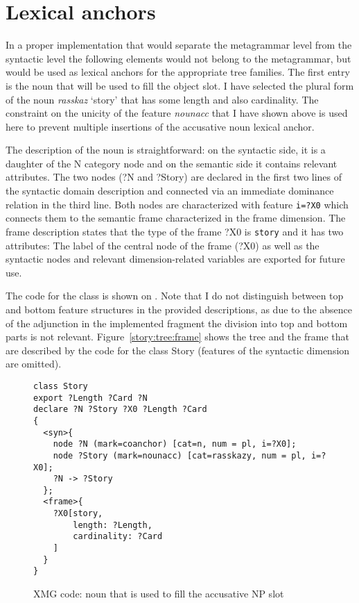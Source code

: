 \section{Lexical anchors}
In a proper implementation that would separate the metagrammar level from the syntactic level the following elements would not belong to the metagrammar, but would be used as lexical anchors for the appropriate tree families. The first entry is the noun that will be used to fill the object slot. I have selected the plural form of the noun \textit{rasskaz} `story' that has some length and also cardinality. The constraint on the unicity of the feature \textit{nounacc} that I have shown above is used here to prevent multiple insertions of the accusative noun lexical anchor.

The description of the noun is straightforward: on the syntactic side, it is a daughter of the N category node and on the semantic side it contains relevant attributes. The two nodes (?N and ?Story) are declared in the first two lines of the syntactic domain description and connected via an immediate dominance relation in the third line. Both nodes are characterized with feature \texttt{i=?X0} which connects them to the semantic frame characterized in the frame dimension. The frame description states that the type of the frame ?X0 is \texttt{story} and it has two attributes: The label of the central node of the frame (?X0) as well as the syntactic nodes and relevant dimension-related variables are exported for future use. 

The code for the class is shown on . Note that I do not distinguish between top and bottom feature structures in the provided descriptions, as due to the absence of the adjunction in the implemented fragment the division into top and bottom parts is not relevant. Figure~\ref{story:tree:frame} shows the tree and the frame that are described by the code for the class Story (features of the syntactic dimension are omitted).

\begin{figure}
\begin{verbatim}
class Story
export ?Length ?Card ?N
declare ?N ?Story ?X0 ?Length ?Card
{
  <syn>{
    node ?N (mark=coanchor) [cat=n, num = pl, i=?X0];
    node ?Story (mark=nounacc) [cat=rasskazy, num = pl, i=?X0];
    ?N -> ?Story
  };
  <frame>{
    ?X0[story,
        length: ?Length,
        cardinality: ?Card
    ]
  }
}
\end{verbatim}
\caption{XMG code: noun that is used to fill the accusative NP slot \label{xmg:noun}}
\end{figure}


